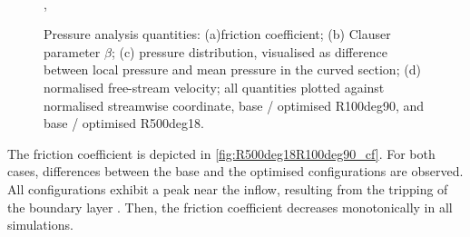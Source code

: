 \begin{figure}[H]
\centering
\begin{subfigure}[t]{0.495\textwidth}
    \centering
    \subcaption{}
    
    \label{fig:R500deg18R100deg90_cf}
\end{subfigure}
\hfill
\begin{subfigure}[t]{0.495\textwidth}
    \subcaption{}
    \centering
    
    \label{fig:R500deg18R100deg90_beta}
\end{subfigure}
\\[-20pt]
\begin{subfigure}[t]{0.495\textwidth}
    \centering
    \subcaption{}
    
    \label{fig:R500deg18R100deg90_pres}
\end{subfigure}
\hfill
\begin{subfigure}[t]{0.495\textwidth}
    \centering
    \subcaption{}
    
    \label{fig:R500deg18R100deg90_Ue}
\end{subfigure}
\caption[Pressure analysis quantities: (a)friction coefficient; (b) Clauser parameter $\beta$; (c) pressure distribution, visualised as difference between local pressure and mean pressure in the curved section; (d) normalised free-stream velocity; all quantities plotted against normalised streamwise coordinate]{Pressure analysis quantities: (a)friction coefficient; (b) Clauser parameter $\beta$; (c) pressure distribution, visualised as difference between local pressure and mean pressure in the curved section; (d) normalised free-stream velocity; all quantities plotted against normalised streamwise coordinate,  base / optimised R100deg90, and  base /  optimised R500deg18.},
\label{fig:R500deg18R100deg90}
\end{figure}



The friction coefficient is depicted in \autoref{fig:R500deg18R100deg90_cf}.
For both cases, differences between the base and the optimised configurations are observed.
All configurations exhibit a peak near the inflow, resulting from the tripping of the boundary layer \citep{schlatter_turbulent_2012}.
Then, the friction coefficient decreases monotonically in all simulations.

